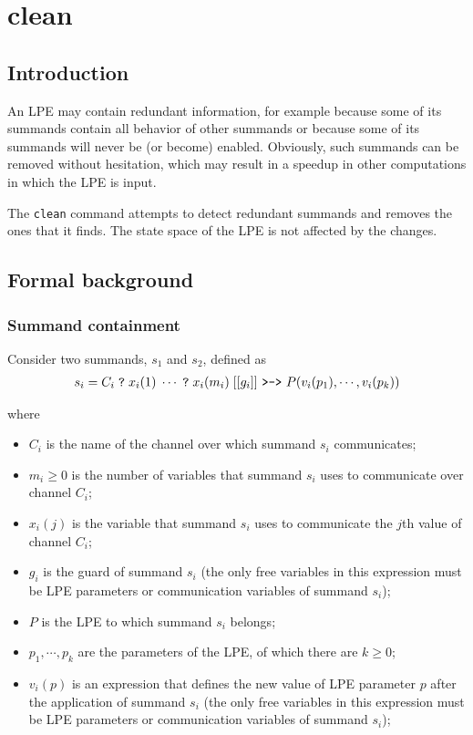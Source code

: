 \chapter{clean} \label{clean}

\section{Introduction}

An LPE may contain redundant information, for example because some of its summands contain all behavior of other summands or because some of its summands will never be (or become) enabled.
Obviously, such summands can be removed without hesitation, which may result in a speedup in other computations in which the LPE is input.

The \texttt{clean} command attempts to detect redundant summands and removes the ones that it finds.
The state space of the LPE is not affected by the changes.

\section{Formal background}

\subsection{Summand containment}

Consider two summands, $s_1$ and $s_2$, defined as
\begin{align*}
s_i = C_i \; \texttt{?} \; x_i(1) \; \cdots{} \; \texttt{?} \; x_i(m_i) \; [[g_i]] \text{ \texttt{>->} } P(v_i(p_1), \cdots{}, v_i(p_k))
\end{align*}

where

\begin{itemize}
\item $C_i$ is the name of the channel over which summand $s_i$ communicates;
\item $m_i \geq 0$ is the number of variables that summand $s_i$ uses to communicate over channel $C_i$;
\item $x_i(j)$ is the variable that summand $s_i$ uses to communicate the $j$th value of channel $C_i$;
\item $g_i$ is the guard of summand $s_i$ (the only free variables in this expression must be LPE parameters or communication variables of summand $s_i$);
\item $P$ is the LPE to which summand $s_i$ belongs;
\item $p_1, \cdots{}, p_k$ are the parameters of the LPE, of which there are $k \geq 0$;
\item $v_i(p)$ is an expression that defines the new value of LPE parameter $p$ after the application of summand $s_i$ (the only free variables in this expression must be LPE parameters or communication variables of summand $s_i$);
\end{itemize}

